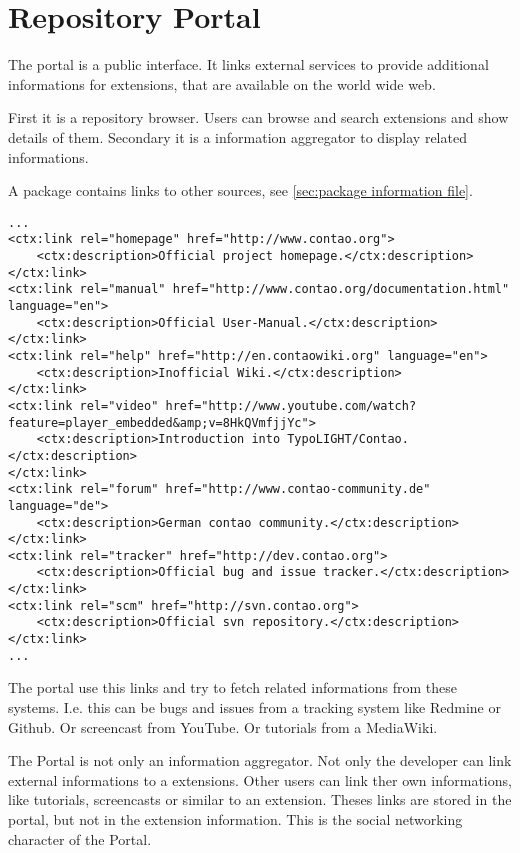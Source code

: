 \section[sec:repository portal]{Repository Portal}

The portal is a public interface. It links external services to provide additional informations for extensions, that are available on the world wide web.

First it is a repository browser. Users can browse and search extensions and show details of them.
Secondary it is a information aggregator to display related informations.

A package contains links to other sources, see \ref{sec:package information file}.
\lstset{language=XML} 
\begin{lstlisting}[caption=XML example: links to other sources]
...
<ctx:link rel="homepage" href="http://www.contao.org">
    <ctx:description>Official project homepage.</ctx:description>
</ctx:link>
<ctx:link rel="manual" href="http://www.contao.org/documentation.html" language="en">
    <ctx:description>Official User-Manual.</ctx:description>
</ctx:link>
<ctx:link rel="help" href="http://en.contaowiki.org" language="en">
    <ctx:description>Inofficial Wiki.</ctx:description>
</ctx:link>
<ctx:link rel="video" href="http://www.youtube.com/watch?feature=player_embedded&amp;v=8HkQVmfjjYc">
    <ctx:description>Introduction into TypoLIGHT/Contao.</ctx:description>
</ctx:link>
<ctx:link rel="forum" href="http://www.contao-community.de" language="de">
    <ctx:description>German contao community.</ctx:description>
</ctx:link>
<ctx:link rel="tracker" href="http://dev.contao.org">
    <ctx:description>Official bug and issue tracker.</ctx:description>
</ctx:link>
<ctx:link rel="scm" href="http://svn.contao.org">
    <ctx:description>Official svn repository.</ctx:description>
</ctx:link>
...
\end{lstlisting}
The portal use this links and try to fetch related informations from these systems. I.e. this can be bugs and issues from a tracking system like Redmine or Github. Or screencast from YouTube. Or tutorials from a MediaWiki.

The Portal is not only an information aggregator. Not only the developer can link external informations to a extensions.
Other users can link ther own informations, like tutorials, screencasts or similar to an extension.
Theses links are stored in the portal, but not in the extension information. This is the social networking character of the Portal.

